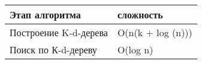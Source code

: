 \begin{tabular}{||p{7cm}||p{3cm}||}
\hline
Этап алгоритма & сложность\\
\hline\hline
Построение K-d-дерева &  O(n(k + log (n))) \\
Поиск по К-d-дереву & O(log n)  \\
\hline
\end{tabular}